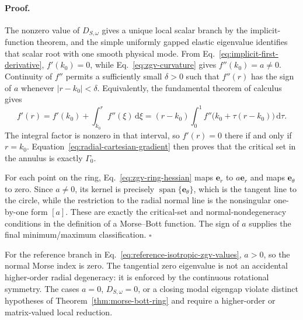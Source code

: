\paragraph{Proof.}
The nonzero value of \(D_{S,\omega}\) gives a unique local scalar branch by
the implicit-function theorem, and the simple uniformly gapped elastic
eigenvalue identifies that scalar root with one smooth physical mode.  From
Eq.~\eqref{eq:implicit-first-derivative},
\(f'(k_0)=0\), while Eq.~\eqref{eq:zgv-curvature} gives
\(f''(k_0)=a\neq0\).  Continuity of \(f''\) permits a sufficiently small
\(\delta>0\) such that \(f''(r)\) has the sign of \(a\) whenever
\(|r-k_0|<\delta\).  Equivalently, the fundamental theorem of calculus gives
\begin{equation}
  f'(r)=f'(k_0)+\int_{k_0}^{r}f''(\xi)\,\mathrm{d}\xi
       =(r-k_0)\int_0^1 f''\bigl(k_0+\tau(r-k_0)\bigr)\,\mathrm{d}\tau.
  \label{eq:local-critical-radius-factorization}
\end{equation}
The integral factor is nonzero in that interval, so \(f'(r)=0\) there if and
only if \(r=k_0\).  Equation~\eqref{eq:radial-cartesian-gradient} then proves
that the critical set in the annulus is exactly \(\Gamma_0\).

For each point on the ring,
Eq.~\eqref{eq:zgv-ring-hessian} maps \(\mathbf{e}_r\) to
\(a\mathbf{e}_r\) and maps \(\mathbf{e}_\theta\) to zero.  Since \(a\neq0\),
its kernel is precisely \(\operatorname{span}\{\mathbf{e}_\theta\}\), which
is the tangent line to the circle, while the restriction to the radial
normal line is the nonsingular one-by-one form \([a]\).  These are exactly
the critical-set and normal-nondegeneracy conditions in the definition of a
Morse--Bott function.  The sign of \(a\) supplies the final minimum/maximum
classification. \(\square\)

For the reference branch in Eq.~\eqref{eq:reference-isotropic-zgv-values},
\(a>0\), so the normal Morse index is zero.  The tangential zero eigenvalue is
not an accidental higher-order radial degeneracy: it is enforced by the
continuous rotational symmetry.  The cases \(a=0\),
\(D_{S,\omega}=0\), or a closing modal eigengap violate distinct hypotheses
of Theorem~\ref{thm:morse-bott-ring} and require a higher-order or
matrix-valued local reduction.
